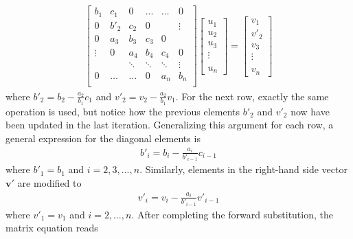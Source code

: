 \documentclass[aps,prl,reprint,toc]{revtex4-1}
\begin{document}
\begin{align*}
  \begin{bmatrix}
    b_1 & c_1 & 0  & \hdots & \hdots &   0    \\
    0 & b'_2 & c_2 & 0      & &\vdots \\
    0 & a_3 & b_3  & c_3     & 0 &  \\
    \vdots & 0 & a_4  & b_4     & c_4 & 0 \\
    & & \ddots & \ddots & \ddots & \vdots\\
    0 & \hdots  &\hdots & 0 &a_n & b_n \\
  \end{bmatrix}
  \begin{bmatrix}
    u_1 \\ u_2 \\ u_3 \\ \vdots \\ \\ u_n
  \end{bmatrix}
  =
  \begin{bmatrix}
    v_1 \\ v'_2 \\ v_3 \\ \vdots \\ \\ v_n
  \end{bmatrix}
\end{align*}
where $b'_2 = b_2 - \frac{a_2}{b_1} c_1$ and $v'_2 = v_2 - \frac{a_2}{b_1}v_1$.
For the next row, exactly the same operation is used, but notice how the previous
elements $b'_2$ and $v'_2$ now have been updated in the last iteration. Generalizing this
argument for each row, a general expression for the diagonal elements is
\begin{align*}
  b'_i = b_i - \frac{a_i}{b'_{i-1}}c_{i-1}
\end{align*}
where $b'_1 = b_1$ and $i = 2,3,...,n$. Similarly, elements in the right-hand side vector
$\mathbf{v}'$ are modified to
\begin{align*}
  v'_{i} = v_i - \frac{a_i}{b'_{i-1}}v'_{i-1}
\end{align*}
where $v'_1 = v_1$ and $i = 2,\hdots,n$. After completing the forward substitution,
the matrix equation reads
\end{document}
